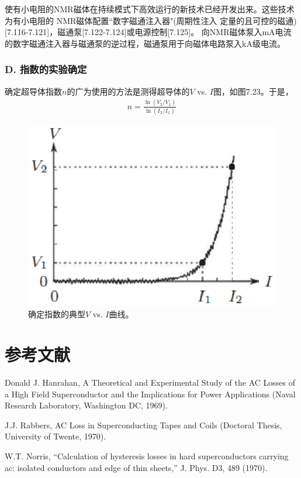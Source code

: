 使有小电阻的NMR磁体在持续模式下高效运行的新技术已经开发出来。这些技术为有小电阻的
NMR磁体配置``数字磁通注入器"(周期性注入
定量的且可控的磁通)[7.116-7.121]，磁通泵[7.122-7.124]或电源控制[7.125]。
向NMR磁体泵入mA电流的数字磁通注入器与磁通泵的逆过程，磁通泵用于向磁体电路泵入kA级电流。

\subsubsection*{D. 指数的实验确定}
确定超导体指数$n$的广为使用的方法是测得超导体的$V$ vs. $I$图，如图7.23。于是，
\begin{align*}%
n=\frac{\ln(V_2/V_1)}{\ln(I_2/I_1)} \tag{7.48}
\end{align*}

\begin{figure}[htbp]
	\centering
	\includegraphics[scale=0.8]{chpt7/figs/fig7.23.eps}
	\caption{确定指数的典型$V$ vs. $I$曲线。}
\end{figure}

\section*{参考文献}
\noindent [7.1] Donald J. Hanrahan, A Theoretical and Experimental Study of the AC Losses of a High Field Superconductor and the Implications for Power Applications (Naval Research Laboratory, Washington DC, 1969).

\noindent [7.2] J.J. Rabbers, AC Loss in Superconducting Tapes and Coils (Doctoral Thesis, University of Twente, 1970).

\noindent [7.3] W.T. Norris, ``Calculation of hysteresis losses in hard superconductors carrying ac: isolated conductors and edge of thin sheets,” J. Phys. D3, 489 (1970).

